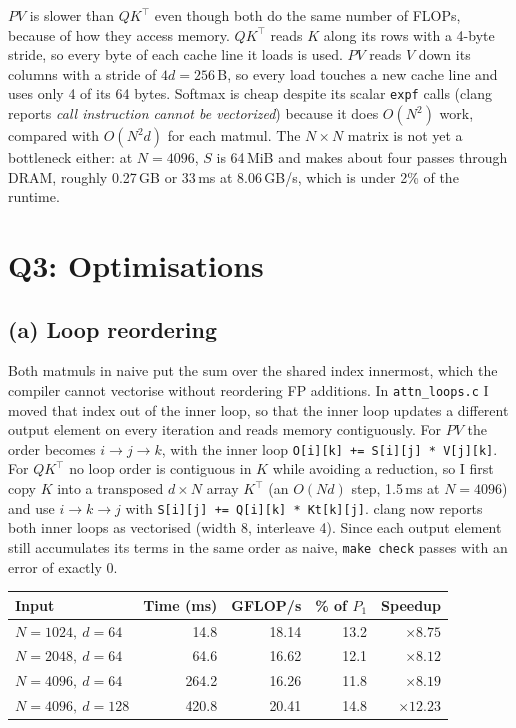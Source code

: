 \documentclass[11pt,a4paper]{article}
\begin{document}
$PV$ is slower than $QK^\top$ even though both do the same number of FLOPs, because of how they
access memory. $QK^\top$ reads $K$ along its rows with a 4-byte stride, so every byte of each
cache line it loads is used. $PV$ reads $V$ down its columns with a stride of $4d = 256$\,B, so
every load touches a new cache line and uses only 4 of its 64 bytes. Softmax is cheap despite
its scalar \texttt{expf} calls (clang reports \emph{call instruction cannot be vectorized})
because it does $O(N^2)$ work, compared with $O(N^2d)$ for each matmul. The $N \times N$ matrix
is not yet a bottleneck either: at $N=4096$, $S$ is 64\,MiB and makes about four passes through
DRAM, roughly 0.27\,GB or 33\,ms at 8.06\,GB/s, which is under 2\% of the runtime.

\section*{Q3: Optimisations}
\subsection*{(a) Loop reordering}

Both matmuls in naive put the sum over the shared index innermost, which the compiler cannot
vectorise without reordering FP additions. In \texttt{attn\_loops.c} I moved that index out of
the inner loop, so that the inner loop updates a different output element on every iteration
and reads memory contiguously. For $PV$ the order becomes $i \to j \to k$, with the inner loop
\texttt{O[i][k] += S[i][j] * V[j][k]}. For $QK^\top$ no loop order is contiguous in $K$ while
avoiding a reduction, so I first copy $K$ into a transposed $d \times N$ array $K^\top$ (an
$O(Nd)$ step, 1.5\,ms at $N=4096$) and use $i \to k \to j$ with
\texttt{S[i][j] += Q[i][k] * Kt[k][j]}. clang now reports both inner loops as vectorised (width 8,
interleave 4). Since each output element still accumulates its terms in the same order as
naive, \texttt{make check} passes with an error of exactly 0.

\begin{center}
\begin{tabular}{@{}lrrrr@{}}
\toprule
Input & Time (ms) & GFLOP/s & \% of $P_1$ & Speedup \\
\midrule
$N=1024,\ d=64$  & 14.8  & 18.14 & 13.2 & $\times8.75$ \\
$N=2048,\ d=64$  & 64.6  & 16.62 & 12.1 & $\times8.12$ \\
$N=4096,\ d=64$  & 264.2 & 16.26 & 11.8 & $\times8.19$ \\
$N=4096,\ d=128$ & 420.8 & 20.41 & 14.8 & $\times12.23$ \\
\bottomrule
\end{tabular}
\end{center}
\end{document}
